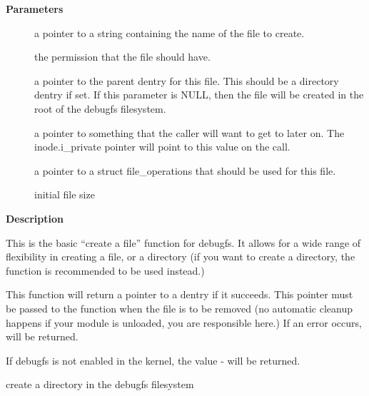 \documentclass[a4paper,8pt,english]{sphinxmanual}
\begin{document}
\textbf{Parameters}
\begin{description}
\item[{}] \leavevmode
a pointer to a string containing the name of the file to create.

\item[{}] \leavevmode
the permission that the file should have.

\item[{}] \leavevmode
a pointer to the parent dentry for this file.  This should be a
directory dentry if set.  If this parameter is NULL, then the
file will be created in the root of the debugfs filesystem.

\item[{}] \leavevmode
a pointer to something that the caller will want to get to later
on.  The inode.i\_private pointer will point to this value on
the  call.

\item[{}] \leavevmode
a pointer to a struct file\_operations that should be used for
this file.

\item[{}] \leavevmode
initial file size

\end{description}

\textbf{Description}

This is the basic ``create a file'' function for debugfs.  It allows for a
wide range of flexibility in creating a file, or a directory (if you want
to create a directory, the {\hyperref[filesystems/index:c.debugfs_create_dir]{\emph{}}} function is
recommended to be used instead.)

This function will return a pointer to a dentry if it succeeds.  This
pointer must be passed to the {\hyperref[filesystems/index:c.debugfs_remove]{\emph{}}} function when the file is
to be removed (no automatic cleanup happens if your module is unloaded,
you are responsible here.)  If an error occurs,  will be returned.

If debugfs is not enabled in the kernel, the value - will be
returned.

\begin{fulllineitems}
\label{filesystems/index:c.debugfs_create_dir}
create a directory in the debugfs filesystem

\end{fulllineitems}
\end{document}
